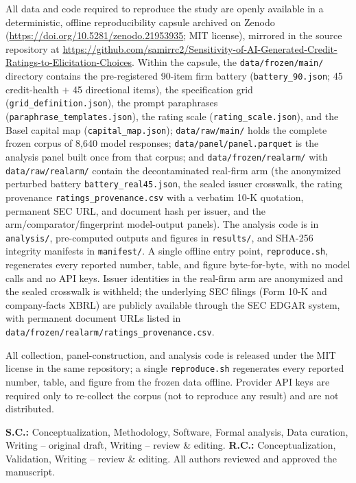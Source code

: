 \documentclass[pdflatex,sn-nature,lineno]{sn-jnl}
\theoremstyle{thmstyleone}
\begin{document}
\backmatter
{}
All data and code required to reproduce the study are openly available in a deterministic, offline
reproducibility capsule archived on Zenodo (\url{https://doi.org/10.5281/zenodo.21953935}; MIT license),
mirrored in the source repository at \url{https://github.com/samirrc2/Sensitivity-of-AI-Generated-Credit-Ratings-to-Elicitation-Choices}. Within the capsule, the
\texttt{data/frozen/main/} directory contains the pre-registered 90-item firm battery
(\texttt{battery\_90.json}; 45 credit-health $+$ 45 directional items), the specification grid
(\texttt{grid\_definition.json}), the prompt paraphrases (\texttt{paraphrase\_templates.json}), the
rating scale (\texttt{rating\_scale.json}), and the Basel capital map (\texttt{capital\_map.json});
\texttt{data/raw/main/} holds the complete frozen corpus of 8{,}640 model responses;
\texttt{data/panel/panel.parquet} is the analysis panel built once from that corpus; and
\texttt{data/frozen/realarm/} with \texttt{data/raw/realarm/} contain the decontaminated real-firm arm
(the anonymized perturbed battery \texttt{battery\_real45.json}, the sealed issuer crosswalk, the rating
provenance \texttt{ratings\_provenance.csv} with a verbatim 10-K quotation, permanent SEC URL, and
document hash per issuer, and the arm/comparator/fingerprint model-output panels). The analysis code is
in \texttt{analysis/}, pre-computed outputs and figures in \texttt{results/}, and SHA-256 integrity
manifests in \texttt{manifest/}. A single offline entry point, \texttt{reproduce.sh}, regenerates every
reported number, table, and figure byte-for-byte, with no model calls and no API keys. Issuer identities
in the real-firm arm are anonymized and the sealed crosswalk is withheld; the underlying SEC filings
(Form 10-K and company-facts XBRL) are publicly available through the SEC EDGAR system, with permanent
document URLs listed in \texttt{data/frozen/realarm/ratings\_provenance.csv}.

All collection, panel-construction, and analysis code is released under the MIT license in the same
repository; a single \texttt{reproduce.sh} regenerates every reported number, table, and figure from the
frozen data offline. Provider API keys are required only to re-collect the corpus (not to reproduce any
result) and are not distributed.



\textbf{S.C.:} Conceptualization, Methodology, Software, Formal analysis, Data curation, Writing --
original draft, Writing -- review \& editing. \textbf{R.C.:} Conceptualization, Validation, Writing --
review \& editing. All authors reviewed and approved the manuscript.
\end{document}
